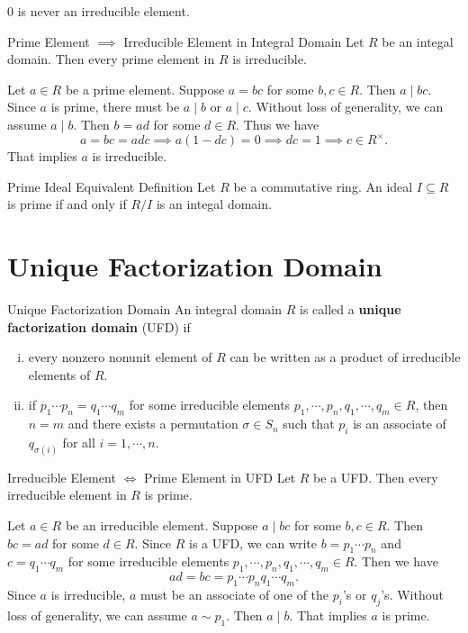 0 is never an irreducible element.
\begin{proposition}{Prime Element $\implies$ Irreducible Element in Integral Domain}{}
    Let $R$ be an integal domain. Then every prime element in $R$ is irreducible.
\end{proposition}

\begin{prf}
    Let $a\in R$ be a prime element. Suppose $a=bc$ for some $b,c\in R$. Then $a\mid bc$. Since $a$ is prime, there must be $a\mid b$ or $a\mid c$. Without loss of generality, we can assume $a\mid b$. Then $b=ad$ for some $d\in R$. Thus we have $$a=bc=adc\implies a(1-dc)=0\implies dc=1\implies c\in R^\times.$$ That implies $a$ is irreducible.
\end{prf}

\begin{proposition}{Prime Ideal Equivalent Definition}{}
    Let $R$ be a commutative ring. An ideal $I\subseteq R$ is prime if and only if $R/I$ is an integal domain.
\end{proposition}


\section{Unique Factorization Domain}
\begin{definition}{Unique Factorization Domain}{}
    An integral domain $R$ is called a \textbf{unique factorization domain} (UFD) if
    \begin{enumerate}[(i)]
        \item every nonzero nonunit element of $R$ can be written as a product of irreducible elements of $R$.
        \item if $p_1\cdots p_n=q_1\cdots q_m$ for some irreducible elements $p_1,\cdots,p_n,q_1,\cdots,q_m\in R$, then $n=m$ and there exists a permutation $\sigma\in S_n$ such that $p_i$ is an associate of $q_{\sigma(i)}$ for all $i=1,\cdots,n$.
    \end{enumerate}
\end{definition}

\begin{proposition}{Irreducible Element $\iff$ Prime Element in UFD}{}
    Let $R$ be a UFD. Then every irreducible element in $R$ is prime.
\end{proposition}

\begin{prf}
    Let $a\in R$ be an irreducible element. Suppose $a\mid bc$ for some $b,c\in R$. Then $bc=ad$ for some $d\in R$. Since $R$ is a UFD, we can write $b=p_1\cdots p_n$ and $c=q_1\cdots q_m$ for some irreducible elements $p_1,\cdots,p_n,q_1,\cdots,q_m\in R$. Then we have $$ad=bc=p_1\cdots p_nq_1\cdots q_m.$$ Since $a$ is irreducible, $a$ must be an associate of one of the $p_i$'s or $q_j$'s. Without loss of generality, we can assume $a\sim p_1$. Then $a\mid b$. That implies $a$ is prime.
\end{prf}


